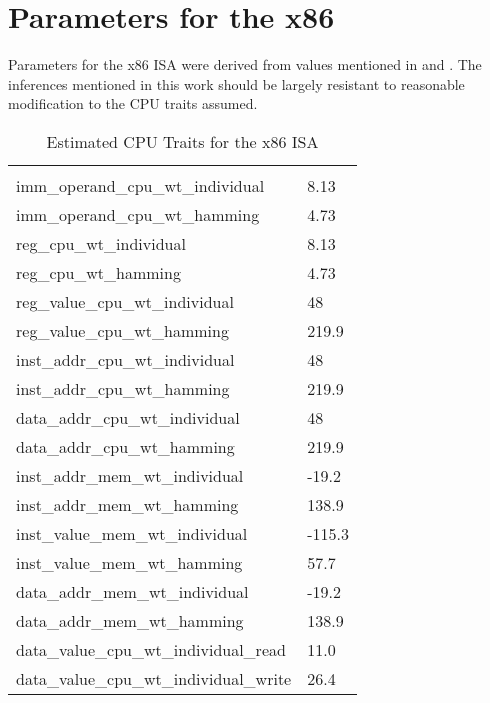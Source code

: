 \section{Parameters for the x86} \label{sec:trait-values}

Parameters for the x86 ISA were derived from values mentioned in
\cite{steinke} and \cite{lee}.  The inferences mentioned in this work
should be largely resistant to reasonable modification to the CPU
traits assumed.

\begin{longtable}{l|l}
  \caption{Estimated CPU Traits for the x86 ISA} \\

  \hline \\

  imm\_operand\_cpu\_wt\_individual & 8.13 \\
  imm\_operand\_cpu\_wt\_hamming & 4.73 \\

  reg\_cpu\_wt\_individual & 8.13 \\
  reg\_cpu\_wt\_hamming & 4.73 \\

  reg\_value\_cpu\_wt\_individual & 48 \\
  reg\_value\_cpu\_wt\_hamming & 219.9 \\

  inst\_addr\_cpu\_wt\_individual & 48 \\
  inst\_addr\_cpu\_wt\_hamming & 219.9 \\

  data\_addr\_cpu\_wt\_individual & 48 \\
  data\_addr\_cpu\_wt\_hamming & 219.9 \\

  inst\_addr\_mem\_wt\_individual & -19.2 \\
  inst\_addr\_mem\_wt\_hamming & 138.9 \\

  inst\_value\_mem\_wt\_individual & -115.3 \\
  inst\_value\_mem\_wt\_hamming & 57.7 \\

  data\_addr\_mem\_wt\_individual & -19.2 \\
  data\_addr\_mem\_wt\_hamming & 138.9 \\

  data\_value\_cpu\_wt\_individual\_read & 11.0 \\
  data\_value\_cpu\_wt\_individual\_write & 26.4 \\


\end{longtable}
